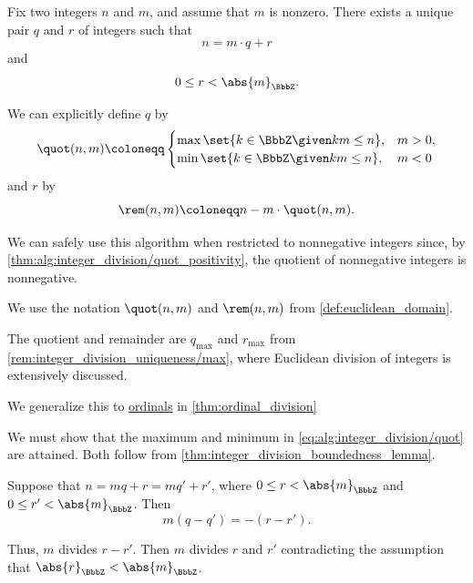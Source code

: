 \begin{algorithm}\label{alg:integer_division}
  Fix two integers \( n \) and \( m \), and assume that \( m \) is nonzero. There exists a unique pair \( q \) and \( r \) of integers such that
  \begin{equation*}
    n = m \cdot q + r
  \end{equation*}
  and
  \begin{equation*}
    0 \leq r < \abs{m}_\BbbZ.
  \end{equation*}

  We can explicitly define \( q \) by
  \begin{equation}\label{eq:alg:integer_division/quot}
    \quot(n, m) \coloneqq \begin{cases}
      \max\set{ k \in \BbbZ \given km \leq n }, &m > 0, \\
      \min\set{ k \in \BbbZ \given km \leq n }, &m < 0
    \end{cases}
  \end{equation}
  and \( r \) by
  \begin{equation}\label{eq:alg:integer_division/rem}
    \rem(n, m) \coloneqq n - m \cdot \quot(n, m).
  \end{equation}
\end{algorithm}
\begin{comments}
  \item We can safely use this algorithm when restricted to nonnegative integers since, by \cref{thm:alg:integer_division/quot_positivity}, the quotient of nonnegative integers is nonnegative.

  \item We use the notation \( \quot(n, m) \) and \( \rem(n, m) \) from \cref{def:euclidean_domain}.

  \item The quotient and remainder are \( q_{\max} \) and \( r_{\max} \) from \cref{rem:integer_division_uniqueness/max}, where Euclidean division of integers is extensively discussed.

  \item We generalize this to \hyperref[def:ordinal]{ordinals} in \cref{thm:ordinal_division}
\end{comments}
\begin{defproof}
  \ExistenceSubProof We must show that the maximum and minimum in \eqref{eq:alg:integer_division/quot} are attained. Both follow from \cref{thm:integer_division_boundedness_lemma}.

  \UniquenessSubProof Suppose that \( n = mq + r = mq' + r' \), where \( 0 \leq r < \abs{m}_\BbbZ \) and \( 0 \leq r' < \abs{m}_\BbbZ \). Then
  \begin{equation*}
    m(q - q') = -(r - r').
  \end{equation*}

  Thus, \( m \) divides \( r - r' \). Then \( m \) divides \( r \) and \( r' \) contradicting the assumption that \( \abs{r}_\BbbZ < \abs{m}_\BbbZ \).
\end{defproof}

